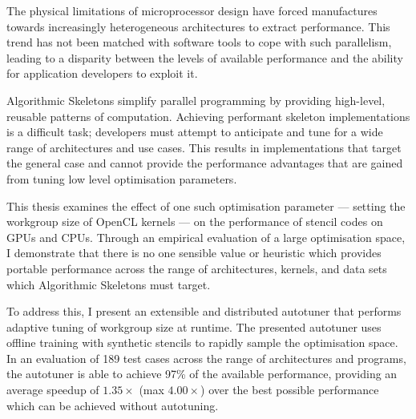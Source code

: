 The physical limitations of microprocessor design have forced
manufactures towards increasingly heterogeneous architectures to
extract performance. This trend has not been matched with software
tools to cope with such parallelism, leading to a disparity between
the levels of available performance and the ability for application
developers to exploit it.

Algorithmic Skeletons simplify parallel programming by providing
high-level, reusable patterns of computation. Achieving performant
skeleton implementations is a difficult task; developers must attempt
to anticipate and tune for a wide range of architectures and use
cases. This results in implementations that target the general case
and cannot provide the performance advantages that are gained from
tuning low level optimisation parameters.

%
This thesis examines the effect of one such optimisation parameter ---
setting the workgroup size of OpenCL kernels --- on the performance of
stencil codes on GPUs and CPUs. Through an empirical evaluation of a
large optimisation space, I demonstrate that there is no one
sensible value or heuristic which provides portable performance across
the range of architectures, kernels, and data sets which Algorithmic
Skeletons must target.

%
To address this, I present an extensible and distributed autotuner
that performs adaptive tuning of workgroup size at runtime. The
presented autotuner uses offline training with synthetic stencils to
rapidly sample the optimisation space. In an evaluation of 189 test
cases across the range of architectures and programs, the autotuner is
able to achieve 97\% of the available performance, providing an
average speedup of $1.35\times$ (max $4.00\times$) over the best
possible performance which can be achieved without autotuning.


